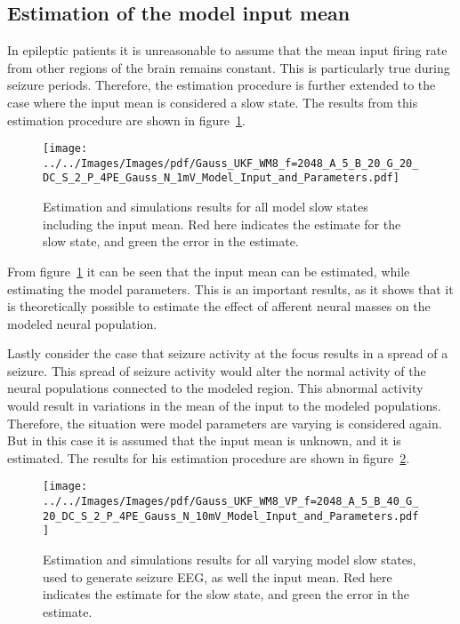 \subsection{Estimation of the model input mean}

In epileptic patients it is unreasonable to assume that the mean input firing rate from other regions of the brain remains constant. This is particularly true during seizure periods. Therefore, the estimation procedure is further extended to the case where the input mean is considered a slow state. The results from this estimation procedure are shown in figure~\ref{fig: ESTMP4}.

\begin{figure}
	\centering
		\texttt{[image: ../../Images/Images/pdf/Gauss\_UKF\_WM8\_f=2048\_A\_5\_B\_20\_G\_20\_DC\_S\_2\_P\_4PE\_Gauss\_N\_1mV\_Model\_Input\_and\_Parameters.pdf]}
	\caption{Estimation and simulations results for all model slow states including the input mean. Red here indicates the estimate for the slow state, and green the error in the estimate.}
	\label{fig: ESTMP4}
\end{figure}


From figure~\ref{fig: ESTMP4} it can be seen that the input mean can be estimated, while estimating the model parameters. This is an important results, as it shows that it is theoretically possible to estimate the effect of afferent neural masses on the modeled neural population.

Lastly consider the case that seizure activity at the focus results in a spread of a seizure. This spread of seizure activity would alter the normal activity of the neural populations connected to the modeled region. This abnormal activity would result in variations in the mean of the input to the modeled populations. Therefore, the situation were model parameters are varying is considered again. But in this case it is assumed that the input mean is unknown, and it is estimated. The results for his estimation procedure are shown in figure~\ref{fig: ESTMP4VP}.

\begin{figure}
	\centering
		\texttt{[image: ../../Images/Images/pdf/Gauss\_UKF\_WM8\_VP\_f=2048\_A\_5\_B\_40\_G\_20\_DC\_S\_2\_P\_4PE\_Gauss\_N\_10mV\_Model\_Input\_and\_Parameters.pdf]}
	\caption{Estimation and simulations results for all varying model slow states, used to generate seizure EEG, as well the input mean. Red here indicates the estimate for the slow state, and green the error in the estimate.}
	\label{fig: ESTMP4VP}
\end{figure}

